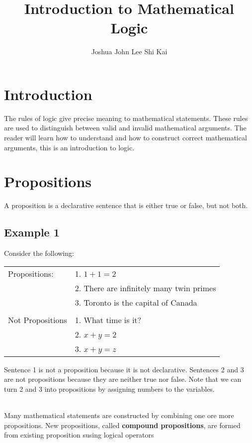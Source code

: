 \documentclass{article}
\title{Introduction to Mathematical Logic}
\author{Joshua John Lee Shi Kai}
\begin{document}
\maketitle
\tableofcontents

\newpage

\section*{Introduction}
The rules of logic give precise meaning to mathematical statements.
These rules are used to distinguish between valid and invalid mathematical arguments.
The reader will learn how to understand and how to construct correct
mathematical arguments, this is an introduction to logic.
\section{Propositions}
A proposition is a declarative sentence that is either true or false,
but not both.
\subsection[Proposition definition]{Example 1}
Consider the following:
\begin{center}
	\begin{tabular}{ll}
		Propositions:    & 1. $1 + 1 = 2$                           \\
		                 & 2. There are infinitely many twin primes \\
		                 & 3. Toronto is the capital of Canada      \\
		                 &                                          \\
		Not Propositions & 1. What time is it?                      \\
		                 & 2. $x + y = 2$                           \\
		                 & 3. $x + y = z$                           \\
	\end{tabular}
\end{center}
Sentence 1 is not a proposition because it is not declarative.
Sentences 2 and 3 are not propositions because they are neither true nor
false. Note that we can turn 2 and 3 into propositions by assigning
numbers to the variables.

\noindent \\ Many mathematical statements are constructed by combining
one ore more propositions. New propositions, called \textbf{compound propositions},
are formed from existing proposition susing logical operators
\end{document}
